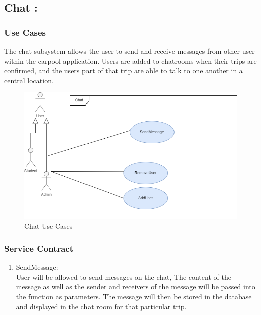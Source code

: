 \documentclass[hidelinks, 12pt, a4paper]{article}
\begin{document}
\subsection{Chat :}
\subsubsection{Use Cases}
The chat subsystem allows the user to send and receive messages from other user within the carpool application. Users are added to chatrooms when their trips are confirmed, and the users part of that trip are able to talk to one another in a central location.

\begin{figure}[H]

      \centering
      \includegraphics[width = 15cm]{images/Chat Usecase.drawio.png}
      \caption{Chat Use Cases}
      \label{fig:User UseCases}

\end{figure}
\newpage
\subsubsection{Service Contract}

\begin{enumerate}[label=U1.\arabic*]

      \item SendMessage:\\
            User will be allowed to send messages on the chat, The content of the message as well as the sender and receivers of the message will be passed into the function as parameters. The message will  then be stored in the database and displayed in the chat room for that particular trip.\\
\end{enumerate}
\end{document}
